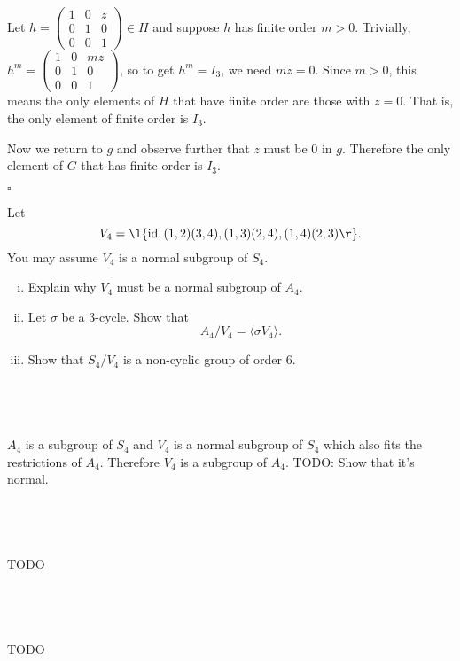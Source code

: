 \documentclass[a4paper]{article}
\begin{document}
Let $h = \begin{pmatrix} 1 & 0 & z \\ 0 & 1 & 0 \\ 0 & 0 & 1 \end{pmatrix} \in H$ and suppose $h$ has finite order $m > 0$. Trivially, $h^m = \begin{pmatrix} 1 & 0 & mz \\ 0 & 1 & 0 \\ 0 & 0 & 1 \end{pmatrix}$, so to get $h^m = I_3$, we need $mz = 0$. Since $m > 0$, this means the only elements of $H$ that have finite order are those with $z = 0$. That is, the only element of finite order is $I_3$.

Now we return to $g$ and observe further that $z$ must be 0 in $g$. Therefore the only element of $G$ that has finite order is $I_3$.

\hfill $\square$



\begin{questionbody}
Let \[
V_4 = \l\{ \mathrm{id}, (1,2)(3,4), (1,3)(2,4), (1,4)(2,3) \r\}.
\] You may assume $V_4$ is a normal subgroup of $S_4$.
%
\begin{enumerate}[(i)]
\item Explain why $V_4$ must be a normal subgroup of $A_4$.

\item Let $\sigma$ be a 3-cycle. Show that \[ A_4 / V_4 = \langle \sigma V_4 \rangle . \]

\item Show that $S_4 / V_4$ is a non-cyclic group of order 6.
\end{enumerate}
\end{questionbody}

\subsection{~} %

$A_4$ is a subgroup of $S_4$ and $V_4$ is a normal subgroup of $S_4$ which also fits the restrictions of $A_4$. Therefore $V_4$ is a subgroup of $A_4$. TODO\@: Show that it's normal.

\subsection{~} %

TODO

\subsection{~} %

TODO

\end{document}
